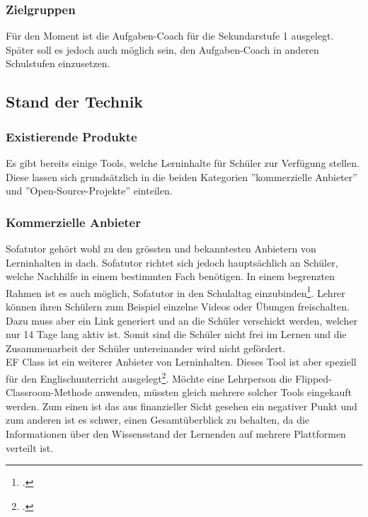 \subsubsection{Zielgruppen}
Für den Moment ist die Aufgaben-Coach für die Sekundarstufe 1 ausgelegt. Später soll es jedoch auch möglich sein, den Aufgaben-Coach in anderen Schulstufen einzusetzen.

\newpage

\subsection{Stand der Technik}
\subsubsection{Existierende Produkte}
Es gibt bereits einige Tools, welche Lerninhalte für Schüler zur Verfügung stellen. Diese lassen sich grundsätzlich in die beiden Kategorien ''kommerzielle Anbieter'' und ''Open-Source-Projekte'' einteilen.


\subsubsection*{Kommerzielle Anbieter}
Sofatutor gehört wohl zu den grössten und bekanntesten Anbietern von Lerninhalten in \gls{dach}. Sofatutor richtet sich jedoch hauptsächlich an Schüler, welche Nachhilfe in einem bestimmten Fach benötigen. In einem begrenzten Rahmen ist es auch möglich, Sofatutor in den Schulaltag einzubinden\footcite{sofatutor_fuer_lehrer}. Lehrer können ihren Schülern zum Beispiel einzelne Videos oder Übungen freischalten. Dazu muss aber ein Link generiert und an die Schüler verschickt werden, welcher nur 14 Tage lang aktiv ist. Somit sind die Schüler nicht frei im Lernen und die Zusammenarbeit der Schüler untereinander wird nicht gefördert.\\

EF Class ist ein weiterer Anbieter von Lerninhalten. Dieses Tool ist aber speziell für den Englischunterricht ausgelegt\footcite{ef_class_homepage}. Möchte eine Lehrperson die Flipped-Classroom-Methode anwenden, müssten gleich mehrere solcher Tools eingekauft werden. Zum einen ist das aus finanzieller Sicht gesehen ein negativer Punkt und zum anderen ist es schwer, einen Gesamtüberblick zu behalten, da die Informationen über den Wissensstand der Lernenden auf mehrere Plattformen verteilt ist.


